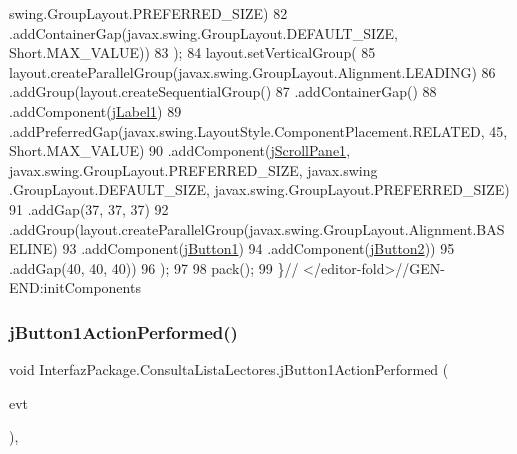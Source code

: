 \begin{DoxyCode}
      swing.GroupLayout.PREFERRED\_SIZE)
82                 .addContainerGap(javax.swing.GroupLayout.DEFAULT\_SIZE, Short.MAX\_VALUE))
83         );
84         layout.setVerticalGroup(
85             layout.createParallelGroup(javax.swing.GroupLayout.Alignment.LEADING)
86             .addGroup(layout.createSequentialGroup()
87                 .addContainerGap()
88                 .addComponent(\mbox{\hyperlink{class_interfaz_package_1_1_consulta_lista_lectores_a527df4a58dc048d5d173177fa32f0764}{jLabel1}})
89                 .addPreferredGap(javax.swing.LayoutStyle.ComponentPlacement.RELATED, 45, Short.MAX\_VALUE)
90                 .addComponent(\mbox{\hyperlink{class_interfaz_package_1_1_consulta_lista_lectores_a787ac57dc3272376d42c09c0c7f1ef71}{jScrollPane1}}, javax.swing.GroupLayout.PREFERRED\_SIZE, javax.swing
      .GroupLayout.DEFAULT\_SIZE, javax.swing.GroupLayout.PREFERRED\_SIZE)
91                 .addGap(37, 37, 37)
92                 .addGroup(layout.createParallelGroup(javax.swing.GroupLayout.Alignment.BASELINE)
93                     .addComponent(\mbox{\hyperlink{class_interfaz_package_1_1_consulta_lista_lectores_a682904c76af705735a4b6c2b4ae04c86}{jButton1}})
94                     .addComponent(\mbox{\hyperlink{class_interfaz_package_1_1_consulta_lista_lectores_a7f8eecc27df6bdc9fc291b6e6c83dc61}{jButton2}}))
95                 .addGap(40, 40, 40))
96         );
97 
98         pack();
99     \}\textcolor{comment}{// </editor-fold>//GEN-END:initComponents}
\end{DoxyCode}
\mbox{\label{class_interfaz_package_1_1_consulta_lista_lectores_aa12d9387e1fcdb4bacd13a7d3471f709}} 
\subsubsection{\texorpdfstring{j\+Button1\+Action\+Performed()}{jButton1ActionPerformed()}}
{\footnotesize\ttfamily void Interfaz\+Package.\+Consulta\+Lista\+Lectores.\+j\+Button1\+Action\+Performed (\begin{DoxyParamCaption}\item[{java.\+awt.\+event.\+Action\+Event}]{evt }\end{DoxyParamCaption})\hspace{0.3cm}{\ttfamily [inline]}, {\ttfamily [private]}}


